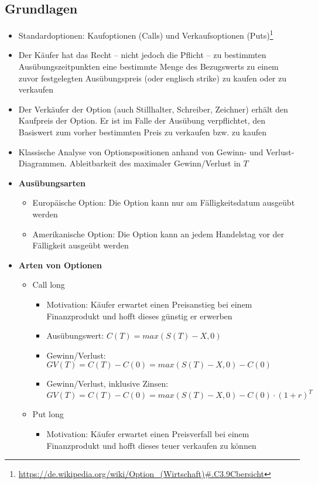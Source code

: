 \subsection{Grundlagen}
\begin{itemize}
	\item Standardoptionen: Kaufoptionen (Calls) und Verkaufsoptionen (Puts)\footnote{\url{https://de.wikipedia.org/wiki/Option_(Wirtschaft)\#.C3.9Cbersicht}}
	\item Der Käufer hat das Recht – nicht jedoch die Pflicht – zu bestimmten Ausübungszeitpunkten eine bestimmte Menge des Bezugswerts zu einem zuvor festgelegten Ausübungspreis (oder englisch strike) zu kaufen oder zu verkaufen
	\item Der Verkäufer der Option (auch Stillhalter, Schreiber, Zeichner) erhält den Kaufpreis der Option. Er ist im Falle der Ausübung verpflichtet, den Basiswert zum vorher bestimmten Preis zu verkaufen bzw. zu kaufen
	\item Klassische Analyse von Optionspositionen anhand von Gewinn- und Verlust-Diagrammen. Ableitbarkeit des maximaler Gewinn/Verlust in \(T\)
	\item \textbf{Ausübungsarten}
	\begin{itemize}
		\item Europäische Option: Die Option kann nur am Fälligkeitsdatum ausgeübt werden
		\item Amerikanische Option: Die Option kann an jedem Handelstag vor der Fälligkeit ausgeübt werden
	\end{itemize}
	\item \textbf{Arten von Optionen}
	\begin{itemize}
		\item Call long
		\begin{itemize}
			\item Motivation: Käufer erwartet einen Preisanstieg bei einem Finanzprodukt und hofft dieses günstig er erwerben
			\item Ausübungswert: \(C(T) = max(S(T)-X,0)\)
			\item Gewinn/Verlust: \(GV(T)=C(T)-C(0) = max(S(T)-X,0)-C(0)\)
			\item Gewinn/Verlust, inklusive Zinsen: \(GV(T)=C(T)-C(0) = max(S(T)-X,0)-C(0) \cdot (1+r)^T\)
		\end{itemize}
		\item Put long
		\begin{itemize}
			\item Motivation: Käufer erwartet einen Preisverfall bei einem Finanzprodukt und hofft dieses teuer verkaufen zu können

\end{itemize}
\end{itemize}
\end{itemize}
